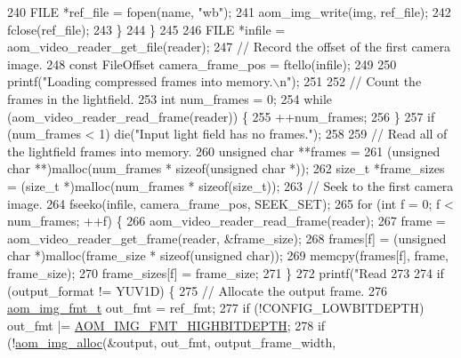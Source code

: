 \begin{DoxyCodeInclude}
{{{{{{240       FILE *ref\_file = fopen(name, \textcolor{stringliteral}{"wb"});
241       aom\_img\_write(img, ref\_file);
242       fclose(ref\_file);
243     \}
244   \}
245 
246   FILE *infile = aom\_video\_reader\_get\_file(reader);
247   \textcolor{comment}{// Record the offset of the first camera image.}
248   \textcolor{keyword}{const} FileOffset camera\_frame\_pos = ftello(infile);
249 
250   printf(\textcolor{stringliteral}{"Loading compressed frames into memory.\(\backslash\)n"});
251 
252   \textcolor{comment}{// Count the frames in the lightfield.}
253   \textcolor{keywordtype}{int} num\_frames = 0;
254   \textcolor{keywordflow}{while} (aom\_video\_reader\_read\_frame(reader)) \{
255     ++num\_frames;
256   \}
257   \textcolor{keywordflow}{if} (num\_frames < 1) die(\textcolor{stringliteral}{"Input light field has no frames."});
258 
259   \textcolor{comment}{// Read all of the lightfield frames into memory.}
260   \textcolor{keywordtype}{unsigned} \textcolor{keywordtype}{char} **frames =
261       (\textcolor{keywordtype}{unsigned} \textcolor{keywordtype}{char} **)malloc(num\_frames * \textcolor{keyword}{sizeof}(\textcolor{keywordtype}{unsigned} \textcolor{keywordtype}{char} *));
262   \textcolor{keywordtype}{size\_t} *frame\_sizes = (\textcolor{keywordtype}{size\_t} *)malloc(num\_frames * \textcolor{keyword}{sizeof}(\textcolor{keywordtype}{size\_t}));
263   \textcolor{comment}{// Seek to the first camera image.}
264   fseeko(infile, camera\_frame\_pos, SEEK\_SET);
265   \textcolor{keywordflow}{for} (\textcolor{keywordtype}{int} f = 0; f < num\_frames; ++f) \{
266     aom\_video\_reader\_read\_frame(reader);
267     frame = aom\_video\_reader\_get\_frame(reader, &frame\_size);
268     frames[f] = (\textcolor{keywordtype}{unsigned} \textcolor{keywordtype}{char} *)malloc(frame\_size * \textcolor{keyword}{sizeof}(\textcolor{keywordtype}{unsigned} \textcolor{keywordtype}{char}));
269     memcpy(frames[f], frame, frame\_size);
270     frame\_sizes[f] = frame\_size;
271   \}
272   printf(\textcolor{stringliteral}{"Read %
273 
274   \textcolor{keywordflow}{if} (output\_format != YUV1D) \{
275     \textcolor{comment}{// Allocate the output frame.}
276     \hyperlink{aom__image_8h_ab71efff8c7f49380fad23b93bc2e9bfc}{aom\_img\_fmt\_t} out\_fmt = ref\_fmt;
277     \textcolor{keywordflow}{if} (!CONFIG\_LOWBITDEPTH) out\_fmt |= \hyperlink{aom__image_8h_a607b37d91f75442f54223ecd85f1b6cb}{AOM\_IMG\_FMT\_HIGHBITDEPTH};
278     \textcolor{keywordflow}{if} (!\hyperlink{aom__image_8h_a570db29fbd122951235a08fe9375f6bb}{aom\_img\_alloc}(&output, out\_fmt, output\_frame\_width,
}}}}}}}
\end{DoxyCodeInclude}
